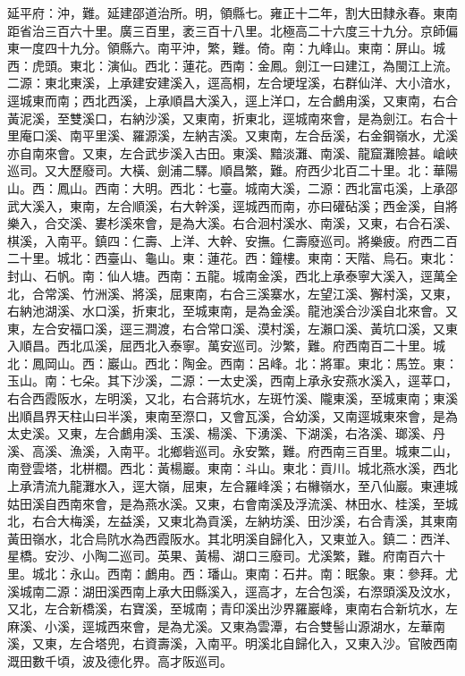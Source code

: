 \begin{pinyinscope}
延平府：沖，難。延建邵道治所。明，領縣七。雍正十二年，割大田隸永春。東南距省治三百六十里。廣三百里，袤三百十八里。北極高二十六度三十九分。京師偏東一度四十九分。領縣六。南平沖，繁，難。倚。南：九峰山。東南：屏山。城西：虎頭。東北：演仙。西北：蓮花。西南：金鳳。劍江一曰建江，為閩江上流。二源：東北東溪，上承建安建溪入，逕高桐，左合埂埕溪，右群仙洋、大小湆水，逕城東而南；西北西溪，上承順昌大溪入，逕上洋口，左合鸕甪溪，又東南，右合黃泥溪，至雙溪口，右納沙溪，又東南，折東北，逕城南來會，是為劍江。右合十里庵口溪、南平里溪、羅源溪，左納吉溪。又東南，左合岳溪，右金鋼嶺水，尤溪亦自南來會。又東，左合武步溪入古田。東溪、黯淡灘、南溪、龍窟灘險甚。嵢峽巡司。又大歷廢司。大橫、劍浦二驛。順昌繁，難。府西少北百二十里。北：華陽山。西：鳳山。西南：大明。西北：七臺。城南大溪，二源：西北富屯溪，上承邵武大溪入，東南，左合順溪，右大幹溪，逕城西而南，亦曰礶砧溪；西金溪，自將樂入，合交溪、婁杉溪來會，是為大溪。右合洄村溪水、南溪，又東，右合石溪、棋溪，入南平。鎮四：仁壽、上洋、大幹、安撫。仁壽廢巡司。將樂疲。府西二百二十里。城北：西臺山、龜山。東：蓮花。西：鐘樓。東南：天階、烏石。東北：封山、石帆。南：仙人塘。西南：五龍。城南金溪，西北上承泰寧大溪入，逕萬全北，合常溪、竹洲溪、將溪，屈東南，右合三溪寨水，左望江溪、獬村溪，又東，右納池湖溪、水口溪，折東北，至城東南，是為金溪。龍池溪合沙溪自北來會。又東，左合安福口溪，逕三澗渡，右合常口溪、漠村溪，左瀨口溪、黃坑口溪，又東入順昌。西北瓜溪，屈西北入泰寧。萬安巡司。沙繁，難。府西南百二十里。城北：鳳岡山。西：巖山。西北：陶金。西南：呂峰。北：將軍。東北：馬笠。東：玉山。南：七朵。其下沙溪，二源：一太史溪，西南上承永安燕水溪入，逕莘口，右合西霞阪水，左明溪，又北，右合蔣坑水，左斑竹溪、隴東溪，至城東南；東溪出順昌界天柱山曰半溪，東南至漈口，又會瓦溪，合幼溪，又南逕城東來會，是為太史溪。又東，左合鸕甪溪、玉溪、楊溪、下湧溪、下湖溪，右洛溪、瑯溪、丹溪、高溪、漁溪，入南平。北鄉砦巡司。永安繁，難。府西南三百里。城東二山，南登雲塔，北栟櫚。西北：黃楊巖。東南：斗山。東北：貢川。城北燕水溪，西北上承清流九龍灘水入，逕大嶺，屈東，左合羅峰溪；右櫞嶺水，至八仙巖。東連城姑田溪自西南來會，是為燕水溪。又東，右會南溪及浮流溪、林田水、桂溪，至城北，右合大梅溪，左益溪，又東北為貢溪，左納坊溪、田沙溪，右合青溪，其東南黃田嶺水，北合烏阬水為西霞阪水。其北明溪自歸化入，又東並入。鎮二：西洋、星橋。安沙、小陶二巡司。英果、黃楊、湖口三廢司。尤溪繁，難。府南百六十里。城北：永山。西南：鸕甪。西：璠山。東南：石井。南：眠象。東：參拜。尤溪城南二源：湖田溪西南上承大田縣溪入，逕高才，左合包溪，右漈頭溪及汶水，又北，左合新橋溪，右寶溪，至城南；青印溪出沙界羅巖峰，東南右合新坑水，左麻溪、小溪，逕城西來會，是為尤溪。又東為雲潭，右合雙髻山源湖水，左華南溪，又東，左合塔兜，右資壽溪，入南平。明溪北自歸化入，又東入沙。官陂西南溉田數千頃，波及德化界。高才阪巡司。


\end{pinyinscope}
